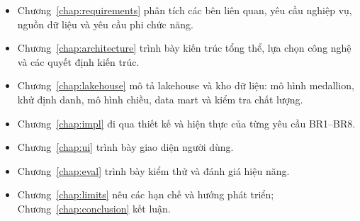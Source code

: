 \begin{itemize}
  \item Chương~\ref{chap:requirements} phân tích các bên liên quan, yêu cầu nghiệp vụ, nguồn dữ liệu và yêu cầu phi chức năng.
  \item Chương~\ref{chap:architecture} trình bày kiến trúc tổng thể, lựa chọn công nghệ và các quyết định kiến trúc.
  \item Chương~\ref{chap:lakehouse} mô tả lakehouse và kho dữ liệu: mô hình medallion, khử định danh, mô hình chiều, data mart và kiểm tra chất lượng.
  \item Chương~\ref{chap:impl} đi qua thiết kế và hiện thực của từng yêu cầu BR1--BR8.
  \item Chương~\ref{chap:ui} trình bày giao diện người dùng.
  \item Chương~\ref{chap:eval} trình bày kiểm thử và đánh giá hiệu năng.
  \item Chương~\ref{chap:limits} nêu các hạn chế và hướng phát triển; Chương~\ref{chap:conclusion} kết luận.
\end{itemize}
